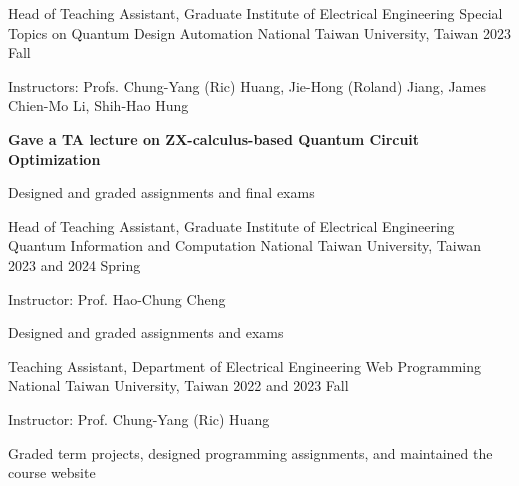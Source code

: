 

\begin{cventries}

     \cventry
        {Head of Teaching Assistant, Graduate Institute of Electrical Engineering}
        {Special Topics on Quantum Design Automation}
        {National Taiwan University, Taiwan}
        {2023 Fall}
        {
            \begin{cvitems}
                \item Instructors: Profs. Chung-Yang (Ric) Huang, Jie-Hong (Roland) Jiang, James Chien-Mo Li, Shih-Hao Hung
                \item \textcolor{awesome}{\textbf{Gave a TA lecture on ZX-calculus-based Quantum Circuit Optimization}}
                \item Designed and graded assignments and final exams
            \end{cvitems}
        }
        
    \cventry
        {Head of Teaching Assistant, Graduate Institute of Electrical Engineering}
        {Quantum Information and Computation}
        {National Taiwan University, Taiwan}
        {2023 and 2024 Spring}
        {
            \begin{cvitems}
                \item Instructor: Prof. Hao-Chung Cheng
                \item Designed and graded assignments and exams
            \end{cvitems}
        }   

    \cventry
        {Teaching Assistant, Department of Electrical Engineering}
        {Web Programming}
        {National Taiwan University, Taiwan}
        {2022 and 2023 Fall}
        {
            \begin{cvitems}
                \item Instructor: Prof. Chung-Yang (Ric) Huang
                \item Graded term projects, designed programming assignments, and maintained the course website
            \end{cvitems}
        }   
\end{cventries}

